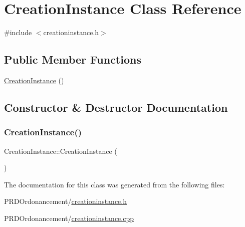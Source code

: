 \hypertarget{classCreationInstance}{}\section{Creation\+Instance Class Reference}
\label{classCreationInstance}


{\ttfamily \#include $<$creationinstance.\+h$>$}

\subsection*{Public Member Functions}
\begin{DoxyCompactItemize}
\item 
\hyperlink{classCreationInstance_af3d5a102616539b753a82ea83cded735}{Creation\+Instance} ()
\end{DoxyCompactItemize}


\subsection{Constructor \& Destructor Documentation}
\mbox{\label{classCreationInstance_af3d5a102616539b753a82ea83cded735}} 
\subsubsection{\texorpdfstring{Creation\+Instance()}{CreationInstance()}}
{\footnotesize\ttfamily Creation\+Instance\+::\+Creation\+Instance (\begin{DoxyParamCaption}{ }\end{DoxyParamCaption})}



The documentation for this class was generated from the following files\+:\begin{DoxyCompactItemize}
\item 
P\+R\+D\+Ordonancement/\hyperlink{creationinstance_8h}{creationinstance.\+h}\item 
P\+R\+D\+Ordonancement/\hyperlink{creationinstance_8cpp}{creationinstance.\+cpp}\end{DoxyCompactItemize}
